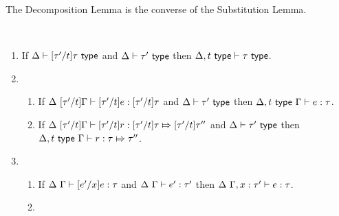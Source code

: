The Decomposition Lemma is the converse of the Substitution Lemma.
\begin{lemma}[Decomposition]\label{lemma:decomposition-UP} ~
\begin{enumerate}
\item If $\Delta \vdash [\tau'/t]\tau~\mathsf{type}$ and $\Delta \vdash \tau'~\mathsf{type}$ then $\Delta, t~\mathsf{type} \vdash \tau~\mathsf{type}$.
\item \begin{enumerate}
  \item If $\Delta~[\tau'/t]\Gamma \vdash [\tau'/t]e : [\tau'/t]\tau$ and $\Delta \vdash \tau'~\mathsf{type}$ then $\Delta, t~\mathsf{type}~\Gamma \vdash e : \tau$.
  \item \begin{grayparbox}
  If $\Delta~[\tau'/t]\Gamma \vdash [\tau'/t]r : [\tau'/t]\tau \Mapsto [\tau'/t]\tau''$ and $\Delta \vdash \tau'~\mathsf{type}$ then $\Delta, t~\mathsf{type}~\Gamma \vdash r : \tau \Mapsto \tau''$.
  \end{grayparbox}
  \end{enumerate}
\item \begin{enumerate}
  \item If $\Delta~\Gamma \vdash [e'/x]e : \tau$ and $\Delta~\Gamma \vdash e' : \tau'$ then $\Delta~\Gamma, x : \tau' \vdash e : \tau$.
  \item {}
  \end{enumerate}
\end{enumerate}\end{lemma}
